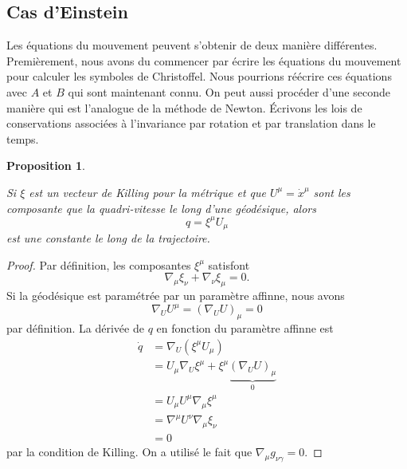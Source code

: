 \documentclass[a4paper,11pt]{report}
\theoremstyle{definition}
\theoremstyle{plain}
\newtheorem{prop}[thm]{Proposition}
\theoremstyle{definition}
\theoremstyle{remark}
\begin{document}
        
        
        \subsection{Cas d'Einstein}
        
            Les équations du mouvement peuvent s'obtenir de deux manière différentes. Premièrement, nous avons du commencer par écrire les équations du mouvement pour calculer les symboles de Christoffel. Nous pourrions réécrire ces équations avec $A$ et $B$ qui sont maintenant connu. On peut aussi procéder d'une seconde manière qui est l'analogue de la méthode de Newton. Écrivons les lois de conservations associées à l'invariance par rotation et par translation dans le temps.
            
            \begin{prop}\begin{leftbar}
                Si $\xi$ est un vecteur de Killing pour la métrique et que $U^\mu = \dot{x}^\mu$ sont les composante que la quadri-vitesse le long d'une géodésique, alors
                \begin{equation}
                    q = \xi^\mu U_\mu
                \end{equation}
                est une constante le long de la trajectoire.
            \end{leftbar}\end{prop}
            
            \begin{proof}
                Par définition, les composantes $\xi^\mu$ satisfont
                \begin{equation}
                    \nabla_\mu\xi_\nu + \nabla_\nu\xi_\mu = 0.
                \end{equation}
                Si la géodésique est paramétrée par un paramètre affinne, nous avons 
                \begin{equation}
                    \nabla_U U^\mu = (\nabla_U U)_\mu = 0
                \end{equation}
                par définition. La dérivée de $q$ en fonction du paramètre affinne  est
                \begin{align}
                    \dot{q} &= \nabla_U(\xi^\mu U_\mu)\\
                    &= U_\mu\nabla_U \xi^\mu + \xi^\mu\underbrace{(\nabla_U U)_\mu}_{0}\\
                    &= U_\mu U^\mu\nabla_\mu \xi^\mu\\
                    &= \nabla^\mu U^\nu \nabla_\mu \xi_\nu\\
                    &= 0
                \end{align}
                par la condition de Killing. On a utilisé le fait que $\nabla_\mu g_{\nu\gamma} = 0$.
            \end{proof}
            
\end{document}
